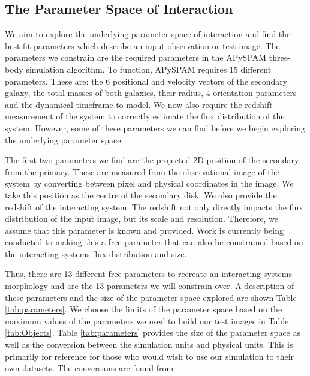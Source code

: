 \subsection{The Parameter Space of Interaction}
We aim to explore the underlying parameter space of interaction and find the best fit parameters which describe an input observation or test image. The parameters we constrain are the required parameters in the APySPAM three-body simulation algorithm. To function, APySPAM requires 15 different parameters. These are: the 6 positional and velocity vectors of the secondary galaxy, the total masses of both galaxies, their radius, 4 orientation parameters and the dynamical timeframe to model. We now also require the redshift measurement of the system to correctly estimate the flux distribution of the system. However, some of these parameters we can find before we begin exploring the underlying parameter space.

The first two parameters we find are the projected 2D position of the secondary from the primary. These are measured from the observational image of the system by converting between pixel and physical coordinates in the image. We take this position as the centre of the secondary disk. We also provide the redshift of the interacting system. The redshift not only directly impacts the flux distribution of the input image, but its scale and resolution. Therefore, we assume that this parameter is known and provided. Work is currently being conducted to making this a free parameter that can also be constrained based on the interacting systems flux distribution and size.

Thus, there are 13 different free parameters to recreate an interacting systems morphology and are the 13 parameters we will constrain over. A description of these parameters and the size of the parameter space explored are shown Table \ref{tab:parameters}. We choose the limits of the parameter space based on the maximum values of the parameters we used to build our test images in Table \ref{tab:Objects}. Table \ref{tab:parameters} provides the size of the parameter space as well as the conversion between the simulation units and physical units. This is primarily for reference for those who would wish to use our simulation to their own datasets. The conversions are found from \citet{1990AJ....100.1477W}.

